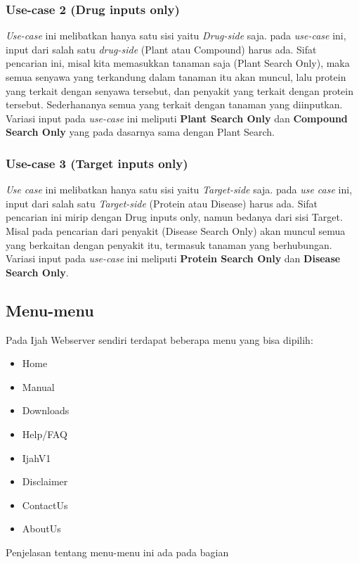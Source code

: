		\subsubsection{Use-case 2 (Drug inputs only)} \label{drug only}
		\emph{Use-case} ini melibatkan hanya satu sisi yaitu \emph{Drug-side} saja. pada \emph{use-case} ini, input dari salah satu \emph{drug-side} (Plant atau Compound) harus ada. Sifat pencarian ini, misal kita memasukkan tanaman saja (Plant Search Only), maka semua senyawa yang terkandung dalam tanaman itu akan muncul, lalu protein yang terkait dengan senyawa tersebut, dan penyakit yang terkait dengan protein tersebut. Sederhananya semua yang terkait dengan tanaman yang diinputkan. Variasi input pada \emph{use-case} ini meliputi \textbf{Plant Search Only} dan \textbf{Compound Search Only} yang pada dasarnya sama dengan Plant Search.
		\subsubsection{Use-case 3 (Target inputs only)} \label{target only}
		\emph{Use case} ini melibatkan hanya satu sisi yaitu \emph{Target-side} saja. pada \emph{use case} ini, input dari salah satu \emph{Target-side} (Protein atau Disease) harus ada. Sifat pencarian ini mirip dengan Drug inputs only, namun bedanya dari sisi Target. Misal pada pencarian dari penyakit (Disease Search Only) akan muncul semua yang berkaitan dengan penyakit itu, termasuk tanaman yang berhubungan. Variasi input pada \emph{use-case} ini meliputi \textbf{Protein Search Only} dan \textbf{Disease Search Only}.


	\subsection{Menu-menu} %
	Pada Ijah Webserver sendiri terdapat beberapa menu yang bisa dipilih:
	\begin{itemize}
	\item Home
	\item Manual
	\item Downloads
	\item Help/FAQ
	\item IjahV1
	\item Disclaimer
	\item ContactUs
	\item AboutUs
	\end{itemize}
	Penjelasan tentang menu-menu ini ada pada bagian \textbf{}


